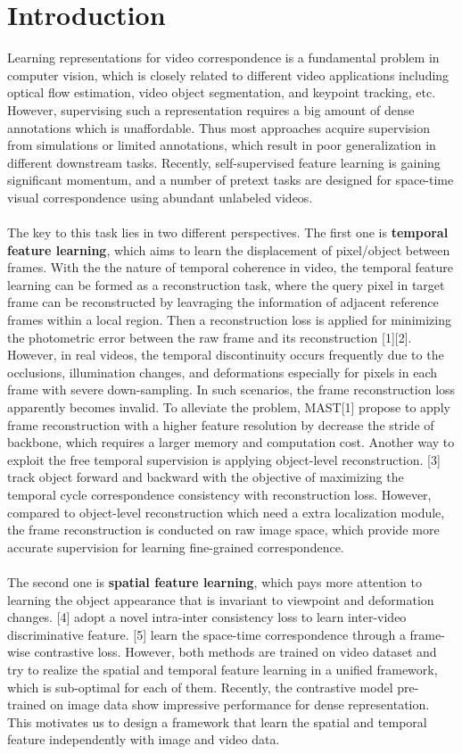\documentclass{article}
\begin{document}
\section{Introduction}
Learning representations for video correspondence is a fundamental problem in computer vision, which is closely related to different video applications including optical flow estimation, video object segmentation, and keypoint tracking, etc. However, supervising such a representation requires a big amount of dense annotations which is unaffordable. Thus most approaches acquire supervision from simulations or limited annotations, which result in poor generalization in different downstream tasks. Recently, self-supervised feature learning is gaining significant momentum, and a number of pretext tasks are designed for space-time visual correspondence using abundant unlabeled videos. \\
\\
The key to this task lies in two different perspectives. The first one is \textbf{temporal feature learning}, which aims to learn the displacement of pixel/object between frames. With the the nature of temporal coherence in video, the temporal feature learning can be formed as a reconstruction task, where the query pixel in target frame can be reconstructed by leavraging the information of adjacent reference frames within a local region. Then a reconstruction loss is applied for minimizing the photometric error between the raw frame and its reconstruction [1][2]. However, in real videos, the temporal discontinuity occurs frequently due to the occlusions, illumination changes, and deformations especially for pixels in each frame with severe down-sampling. In such scenarios, the frame reconstruction loss apparently becomes invalid. To alleviate the problem, MAST[1] propose to apply frame reconstruction with a higher feature resolution by decrease the stride of backbone, which requires a larger memory and computation cost. Another way to exploit the free temporal supervision is applying object-level reconstruction. [3] track object forward and backward with the objective of maximizing the temporal cycle correspondence consistency with reconstruction loss. However, compared to object-level reconstruction which need a extra localization module, the frame reconstruction is conducted on raw image space, which provide more accurate supervision for learning fine-grained correspondence.\\
\\
The second one is \textbf{spatial feature learning}, which pays more attention to learning the object appearance that is invariant to viewpoint and deformation changes.  [4] adopt a novel intra-inter consistency loss to learn inter-video discriminative feature. [5] learn the space-time correspondence through a frame-wise contrastive loss. However, both methods are trained on video dataset and try to realize the spatial and temporal feature learning in a unified framework, which is sub-optimal for each of them. Recently, the contrastive model  pre-trained on image data show impressive performance for dense representation. This motivates us to design a framework that learn the spatial and temporal feature independently with image and video data.  \\
\end{document}
